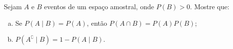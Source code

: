 %
%


\begin{exercicioBanco}[\valorquestao]
Sejam \(A\) e \(B\) eventos de um espaço amostral, onde \(P(B) > 0\). Mostre que:
%
\begin{enumerate}[(a)]
    \item Se \(P(A \mid B) = P(A)\), então \(P(A \cap B) = P(A)P(B)\);
    \item \(P(A^{\complement} \mid B) = 1 - P(A \mid B)\).
\end{enumerate}
%
\end{exercicioBanco}

